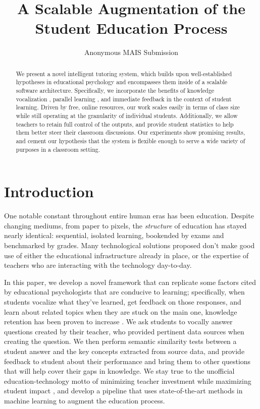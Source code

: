 \documentclass[11pt,a4paper]{article}
\title{A Scalable Augmentation of the Student Education Process}
\author{Anonymous MAIS Submission
}
\date{}
\begin{document}
\maketitle
\begin{abstract}
  We present a novel intelligent tutoring system, which builds upon well-established hypotheses in educational psychology and encompasses them inside of a scalable software architecture. Specifically, we incorporate the benefits of knowledge vocalization \cite{TODO}, parallel learning \cite{TODO}, and immediate feedback \cite{TODO} in the context of student learning. Driven by free, online resources, our work scales easily in terms of class size while still operating at the granularity of individual students. Additionally, we allow teachers to retain full control of the outputs, and provide student statistics to help them better steer their classroom discussions. Our experiments show promising results, and cement our hypothesis that the system is flexible enough to serve a wide variety of purposes in a classroom setting.
\end{abstract}
\section{Introduction}
One notable constant throughout entire human eras has been education. Despite changing mediums, from paper to pixels, the \textit{structure} of education has stayed nearly identical: sequential, isolated learning, bookended by exams and benchmarked by grades. Many technological solutions proposed don't make good use of either the educational infrastructure already in place, or the expertise of teachers who are interacting with the technology day-to-day. 

In this paper, we develop a novel framework that can replicate some factors cited by educational psychologists that are conducive to learning; specifically, when students vocalize what they've learned, get feedback on those responses, and learn about related topics when they are stuck on the main one, knowledge retention has been proven to increase \cite{TODO}. We ask students to vocally answer questions created by their teacher, who provided pertinent data sources when creating the question. We then perform semantic similarity tests between a student answer and the key concepts extracted from source data, and provide feedback to student about their performance and bring them to other questions that will help cover their gaps in knowledge. We stay true to the unofficial education-technology motto of minimizing teacher investment while maximizing student impact \cite{norris_soloway02/12/18}, and develop a pipeline that uses state-of-the-art methods in machine learning to augment the education process.
\end{document}
